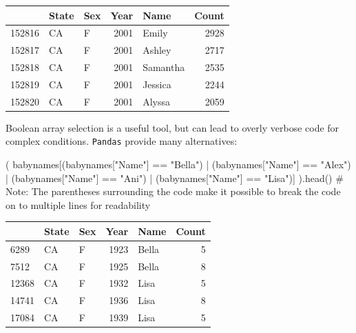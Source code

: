 \documentclass[
  letterpaper,
  DIV=11,
  numbers=noendperiod]{scrreprt}
\newenvironment{Shaded}{\begin{snugshade}}{\end{snugshade}}
\newcommand{\CommentTok}[1]{\textcolor[rgb]{0.37,0.37,0.37}{#1}}
\newcommand{\NormalTok}[1]{\textcolor[rgb]{0.00,0.23,0.31}{#1}}
\newcommand{\OperatorTok}[1]{\textcolor[rgb]{0.37,0.37,0.37}{#1}}
\newcommand{\StringTok}[1]{\textcolor[rgb]{0.13,0.47,0.30}{#1}}
\begin{document}
\begin{tabular}{lllrlr}
\toprule
{} & State & Sex &  Year &      Name &  Count \\
\midrule
152816 &    CA &   F &  2001 &     Emily &   2928 \\
152817 &    CA &   F &  2001 &    Ashley &   2717 \\
152818 &    CA &   F &  2001 &  Samantha &   2535 \\
152819 &    CA &   F &  2001 &   Jessica &   2244 \\
152820 &    CA &   F &  2001 &    Alyssa &   2059 \\
\bottomrule
\end{tabular}

Boolean array selection is a useful tool, but can lead to overly verbose
code for complex conditions. \texttt{Pandas} provide many alternatives:

\begin{Shaded}
\begin{Highlighting}[]
\NormalTok{(}
\NormalTok{    babynames[(babynames[}\StringTok{"Name"}\NormalTok{] }\OperatorTok{==} \StringTok{"Bella"}\NormalTok{) }\OperatorTok{|} 
\NormalTok{              (babynames[}\StringTok{"Name"}\NormalTok{] }\OperatorTok{==} \StringTok{"Alex"}\NormalTok{) }\OperatorTok{|}
\NormalTok{              (babynames[}\StringTok{"Name"}\NormalTok{] }\OperatorTok{==} \StringTok{"Ani"}\NormalTok{) }\OperatorTok{|}
\NormalTok{              (babynames[}\StringTok{"Name"}\NormalTok{] }\OperatorTok{==} \StringTok{"Lisa"}\NormalTok{)]}
\NormalTok{).head()}
\CommentTok{\# Note: The parentheses surrounding the code make it possible to break the code on to multiple lines for readability}
\end{Highlighting}
\end{Shaded}

\begin{tabular}{lllrlr}
\toprule
{} & State & Sex &  Year &   Name &  Count \\
\midrule
6289  &    CA &   F &  1923 &  Bella &      5 \\
7512  &    CA &   F &  1925 &  Bella &      8 \\
12368 &    CA &   F &  1932 &   Lisa &      5 \\
14741 &    CA &   F &  1936 &   Lisa &      8 \\
17084 &    CA &   F &  1939 &   Lisa &      5 \\
\bottomrule
\end{tabular}
\end{document}
